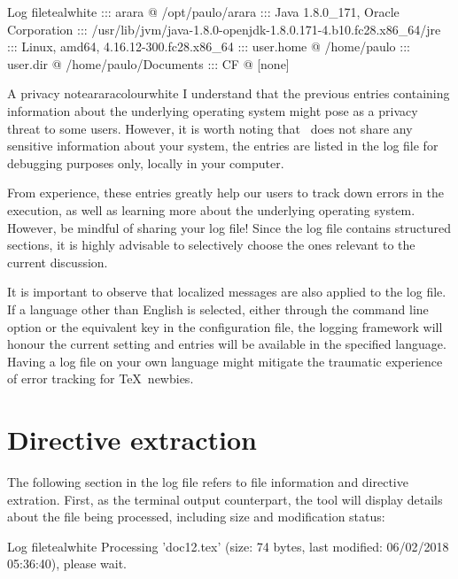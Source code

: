 \begin{codebox}{Log file}{teal}{\icnote}{white}
::: arara @ /opt/paulo/arara
::: Java 1.8.0_171, Oracle Corporation
::: /usr/lib/jvm/java-1.8.0-openjdk-1.8.0.171-4.b10.fc28.x86_64/jre
::: Linux, amd64, 4.16.12-300.fc28.x86_64
::: user.home @ /home/paulo
::: user.dir @ /home/paulo/Documents
::: CF @ [none]
\end{codebox}

\begin{messagebox}{A privacy note}{araracolour}{\icok}{white}
\setlength{\parskip}{1em}
I understand that the previous entries containing information about the underlying operating system might pose as a privacy threat to some users. However, it is worth noting that \arara\ does not share any sensitive information about your system, the entries are listed in the log file for debugging purposes only, locally in your computer.

From experience, these entries greatly help our users to track down errors in the execution, as well as learning more about the underlying operating system. However, be mindful of sharing your log file! Since the log file contains structured sections, it is highly advisable to selectively choose the ones relevant to the current discussion.
\end{messagebox}

It is important to observe that localized messages are also applied to the log file. If a language other than English is selected, either through the  command line option or the equivalent key in the configuration file, the logging framework will honour the current setting and entries will be available in the specified language. Having a log file on your own language might mitigate the traumatic experience of error tracking for \TeX\ newbies.

\section{Directive extraction}
\label{sec:directiveextraction}

The following section in the log file refers to file information and directive extration. First, as the terminal output counterpart, the tool will display details about the file being processed, including size and modification status:

\begin{codebox}{Log file}{teal}{\icnote}{white}
Processing 'doc12.tex' (size: 74 bytes, last modified:
06/02/2018 05:36:40), please wait.
\end{codebox}

